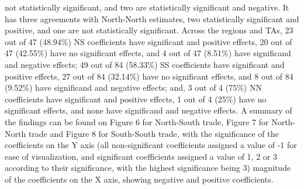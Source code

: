 not statistically significant, and two are statistically significant and
negative. It has three agreements with North-North estimates, two
statistically significant and positive, and one are not statistically
significant. Across the regions and TAs, 23 out of 47 (48.94\%) NS
coefficients have significant and positive effects, 20 out of 47
(42.55\%) have no significant effects, and 4 out of 47 (8.51\%) have
significand and negative effects; 49 out of 84 (58.33\%) SS coefficients
have significant and positive effects, 27 out of 84 (32.14\%) have no
significant effects, and 8 out of 84 (9.52\%) have significand and
negative effects; and, 3 out of 4 (75\%) NN coefficients have
significant and positive effects, 1 out of 4 (25\%) have no significant
effects, and none have significand and negative effects. A summary of
the findings can be found on Figure 6 for North-South trade, Figure 7 for
North-North trade and Figure 8 for South-South trade, with the
significance of the coefficients on the Y axis (all non-significant
coefficients assigned a value of -1 for ease of visualization, and
significant coefficients assigned a value of 1, 2 or 3 according to
their significance, with the highest significance being 3) magnitude of
the coefficients on the X axis, showing negative and positive
coefficients.
